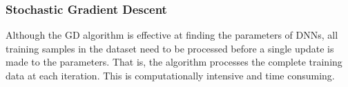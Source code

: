 \documentclass[conference]{IEEEtran}
\begin{document}













\subsubsection{Stochastic Gradient Descent}
Although the GD algorithm is effective at finding the parameters of DNNs, all  training samples in the dataset need to be processed
before a single update is made to the parameters. That is, the algorithm processes the complete training data at each iteration. 
This is computationally intensive and time consuming. 
\end{document}
